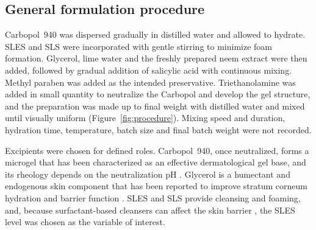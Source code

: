 \documentclass[10pt,a4paper,twocolumn]{article}
\begin{document}
\subsection{General formulation procedure}

Carbopol~940 was dispersed gradually in distilled water and allowed to
hydrate. SLES and SLS were incorporated with gentle stirring to minimize
foam formation. Glycerol, lime water and the freshly prepared neem
extract were then added, followed by gradual addition of salicylic acid
with continuous mixing. Methyl paraben was added as the intended
preservative. Triethanolamine was added in small quantity to neutralize
the Carbopol and develop the gel structure, and the preparation was made
up to final weight with distilled water and mixed until visually uniform
(Figure~\ref{fig:procedure}). Mixing speed and duration, hydration time,
temperature, batch size and final batch weight were not recorded.

Excipients were chosen for defined roles. Carbopol~940, once neutralized,
forms a microgel that has been characterized as an effective
dermatological gel base, and its rheology depends on the neutralization
pH \citep{islam2004}. Glycerol is a humectant and endogenous skin
component that has been reported to improve stratum corneum hydration and
barrier function \citep{fluhr2008}. SLES and SLS provide cleansing and
foaming, and, because surfactant-based cleansers can affect the skin
barrier \citep{ananthapadmanabhan2004,subramanyan2004}, the SLES level
was chosen as the variable of interest.
\end{document}
